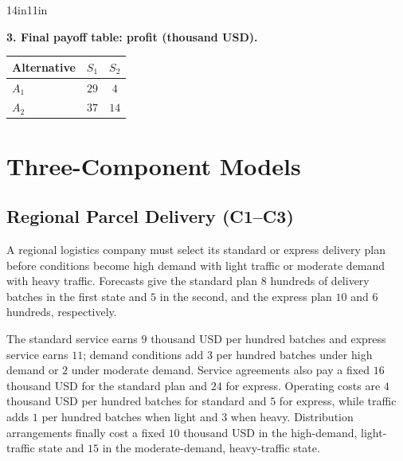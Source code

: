 \begin{CalculationLandscape}{14in}{11in}
\noindent\begin{minipage}{\linewidth}
\textbf{3. Final payoff table: profit (thousand USD).}
\begin{center}
\begin{tabular}{@{}lcc@{}}
\toprule
Alternative & \(S_1\) & \(S_2\) \\
\midrule
\(A_1\) & \(29\) & \(4\) \\
\(A_2\) & \(37\) & \(14\) \\
\bottomrule
\end{tabular}
\end{center}
\end{minipage}



\end{CalculationLandscape}


	\section{Three-Component Models}
	\label{sec:three-component-models}


	\subsection{Regional Parcel Delivery (C1--C3)}
	\label{sec:problem15-regional-parcel-delivery-c1-c3}

	A regional logistics company must select its standard or express delivery plan before conditions become high demand with light traffic or moderate demand with heavy traffic. Forecasts give the standard plan \(8\) hundreds of delivery batches in the first state and \(5\) in the second, and the express plan \(10\) and \(6\) hundreds, respectively.

	The standard service earns \(9\) thousand USD per hundred batches and express service earns \(11\); demand conditions add \(3\) per hundred batches under high demand or \(2\) under moderate demand. Service agreements also pay a fixed \(16\) thousand USD for the standard plan and \(24\) for express. Operating costs are \(4\) thousand USD per hundred batches for standard and \(5\) for express, while traffic adds \(1\) per hundred batches when light and \(3\) when heavy. Distribution arrangements finally cost a fixed \(10\) thousand USD in the high-demand, light-traffic state and \(15\) in the moderate-demand, heavy-traffic state.

